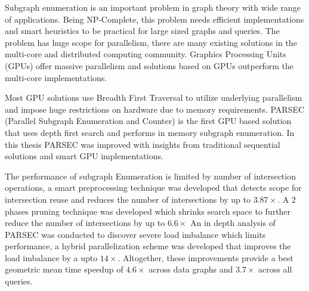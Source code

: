 Subgraph enumeration is an important problem in graph theory with wide range of applications.
Being NP-Complete, this problem needs efficient implementations and smart heuristics to be practical for large sized graphs and queries.
The problem has huge scope for parallelism, there are many existing solutions in the multi-core and distributed computing community.
Graphics Processing Units (GPUs) offer massive parallelism and solutions based on GPUs outperform the multi-core implementations.

Most GPU solutions use Breadth First Traversal to utilize underlying parallelism and impose huge restrictions on hardware due to memory requirements.
PARSEC (Parallel Subgraph Enumeration and Counter) is the first GPU based solution that uses depth first search and performs in memory subgraph enumeration.
In this thesis PARSEC was improved with insights from traditional sequential solutions and smart GPU implementations.

The performance of subgraph Enumeration is limited by number of intersection operations, a smart preprocessing technique was developed that detects scope for intersection reuse and reduces the number of intersections by up to $3.87\times$.
A 2 phases pruning technique was developed which shrinks search space to further reduce the number of intersections by up to $6.6\times$
An in depth analysis of PARSEC was conducted to discover severe load imbalance which limits performance, a hybrid parallelization scheme was developed that improves the load imbalance by a upto $14\times$.
Altogether, these improvements provide a best geometric mean time speedup of $4.6\times$ across data graphs and $3.7\times$ across all queries.

